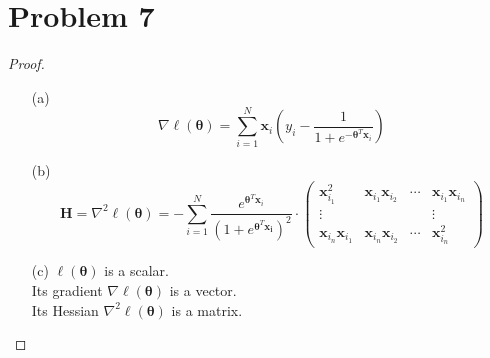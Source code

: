 \documentclass{article}
\begin{document}
\section*{Problem 7}
    \begin{proof}
        \indent
        \begin{itemize}
            \item[(a)]
                $$\nabla \ell(\bm{\theta}) = \sum_{i=1}^{N} \bm{x}_i\left(y_i-\frac{1}{1+e^{-\bm{\theta}^T \bm{x}_i}}\right)$$
            \item[(b)]
                $$\bm{H}=\nabla^2 \ell(\bm{\theta}) = -\sum_{i=1}^{N}\frac{e^{\bm{\theta}^T \bm{x}_i}}{\left(1+e^{\bm{\theta}^T \bm{x_i}}\right)^2}\cdot
                \begin{pmatrix}
                    \bm{x}_{i_1}^2 & \bm{x}_{i_1}\bm{x}_{i_2} & \cdots & \bm{x}_{i_1}\bm{x}_{i_n}\\
                    \vdots & & & \vdots\\
                    \bm{x}_{i_n}\bm{x}_{i_1} & \bm{x}_{i_n}\bm{x}_{i_2} & \cdots & \bm{x}_{i_n}^2
                \end{pmatrix}$$
            \item[(c)]
                $\ell(\bm{\theta})$ is a scalar.\\
                Its gradient $\nabla \ell(\bm{\theta})$ is a vector.\\
                Its Hessian $\nabla^2 \ell(\bm{\theta})$ is a matrix.\\
        \end{itemize}
    \end{proof}
\end{document}
